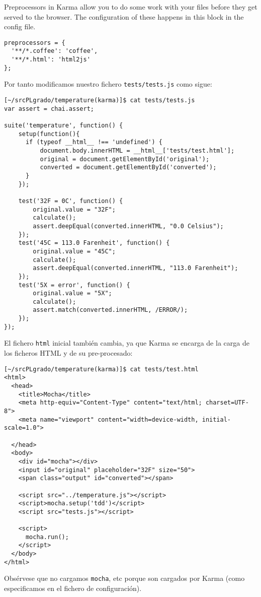 Preprocessors in Karma allow you to do some work with your files before they get served to the browser. The configuration of these happens in this block in the config file.
\begin{verbatim}
preprocessors = {
  '**/*.coffee': 'coffee',
  '**/*.html': 'html2js'
};
\end{verbatim}
Por tanto modificamos nuestro fichero \verb|tests/tests.js| como sigue:
\begin{verbatim}
[~/srcPLgrado/temperature(karma)]$ cat tests/tests.js 
var assert = chai.assert;

suite('temperature', function() {
    setup(function(){
      if (typeof __html__ !== 'undefined') {
          document.body.innerHTML = __html__['tests/test.html'];
          original = document.getElementById('original');
          converted = document.getElementById('converted');
      }
    });

    test('32F = 0C', function() {
        original.value = "32F";
        calculate();
        assert.deepEqual(converted.innerHTML, "0.0 Celsius");
    });
    test('45C = 113.0 Farenheit', function() {
        original.value = "45C";
        calculate();
        assert.deepEqual(converted.innerHTML, "113.0 Farenheit");
    });
    test('5X = error', function() {
        original.value = "5X";
        calculate();
        assert.match(converted.innerHTML, /ERROR/);
    });
});
\end{verbatim}

El fichero \verb|html| inicial también cambia, ya que Karma se encarga
de la carga de los ficheros HTML y de su pre-procesado:

\begin{verbatim}
[~/srcPLgrado/temperature(karma)]$ cat tests/test.html 
<html>
  <head>
    <title>Mocha</title>
    <meta http-equiv="Content-Type" content="text/html; charset=UTF-8">
    <meta name="viewport" content="width=device-width, initial-scale=1.0">

  </head>
  <body>
    <div id="mocha"></div>
    <input id="original" placeholder="32F" size="50">
    <span class="output" id="converted"></span>

    <script src="../temperature.js"></script>
    <script>mocha.setup('tdd')</script>
    <script src="tests.js"></script>

    <script>
      mocha.run();
    </script>
  </body>
</html>
\end{verbatim}
Obsérvese que no cargamos \verb|mocha|, etc porque son cargados por Karma (como especificamos en el fichero de configuración).

